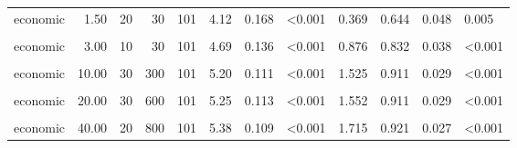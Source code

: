 \documentclass[
]{article}
\begin{document}
\begin{longtable}[t]{lrrrrrrlrrrl}
\hspace{1em}economic & 1.50 & 20 & 30 & 101 & 4.12 & 0.168 & <0.001 & 0.369 & 0.644 & 0.048 & 0.005\\
\hspace{1em}\cellcolor{gray!10}{economic} & \cellcolor{gray!10}{2.00} & \cellcolor{gray!10}{200} & \cellcolor{gray!10}{400} & \cellcolor{gray!10}{101} & \cellcolor{gray!10}{4.57} & \cellcolor{gray!10}{0.140} & \cellcolor{gray!10}{<0.001} & \cellcolor{gray!10}{0.770} & \cellcolor{gray!10}{0.782} & \cellcolor{gray!10}{0.041} & \cellcolor{gray!10}{<0.001}\\
\hspace{1em}economic & 3.00 & 10 & 30 & 101 & 4.69 & 0.136 & <0.001 & 0.876 & 0.832 & 0.038 & <0.001\\
\hspace{1em}\cellcolor{gray!10}{economic} & \cellcolor{gray!10}{4.00} & \cellcolor{gray!10}{100} & \cellcolor{gray!10}{400} & \cellcolor{gray!10}{101} & \cellcolor{gray!10}{4.53} & \cellcolor{gray!10}{0.148} & \cellcolor{gray!10}{<0.001} & \cellcolor{gray!10}{0.692} & \cellcolor{gray!10}{0.762} & \cellcolor{gray!10}{0.043} & \cellcolor{gray!10}{<0.001}\\
\hspace{1em}economic & 10.00 & 30 & 300 & 101 & 5.20 & 0.111 & <0.001 & 1.525 & 0.911 & 0.029 & <0.001\\
\hspace{1em}\cellcolor{gray!10}{economic} & \cellcolor{gray!10}{15.00} & \cellcolor{gray!10}{400} & \cellcolor{gray!10}{6000} & \cellcolor{gray!10}{101} & \cellcolor{gray!10}{5.03} & \cellcolor{gray!10}{0.123} & \cellcolor{gray!10}{<0.001} & \cellcolor{gray!10}{1.245} & \cellcolor{gray!10}{0.861} & \cellcolor{gray!10}{0.035} & \cellcolor{gray!10}{<0.001}\\
\hspace{1em}economic & 20.00 & 30 & 600 & 101 & 5.25 & 0.113 & <0.001 & 1.552 & 0.911 & 0.029 & <0.001\\
\hspace{1em}\cellcolor{gray!10}{economic} & \cellcolor{gray!10}{30.00} & \cellcolor{gray!10}{400} & \cellcolor{gray!10}{12000} & \cellcolor{gray!10}{101} & \cellcolor{gray!10}{5.18} & \cellcolor{gray!10}{0.125} & \cellcolor{gray!10}{<0.001} & \cellcolor{gray!10}{1.340} & \cellcolor{gray!10}{0.871} & \cellcolor{gray!10}{0.034} & \cellcolor{gray!10}{<0.001}\\
\hspace{1em}economic & 40.00 & 20 & 800 & 101 & 5.38 & 0.109 & <0.001 & 1.715 & 0.921 & 0.027 & <0.001\\

\end{longtable}
\end{document}
